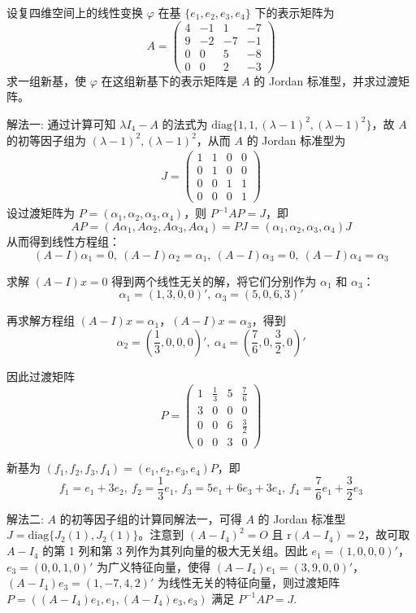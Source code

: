 \documentclass[../../main.tex]{subfiles}
\begin{document}
\begin{example}\label{example:7.59}
设复四维空间上的线性变换 $\varphi$ 在基 $\{e_1,e_2,e_3,e_4\}$ 下的表示矩阵为
\[
A = \begin{pmatrix}
4 & -1 & 1 & -7 \\
9 & -2 & -7 & -1 \\
0 & 0 & 5 & -8 \\
0 & 0 & 2 & -3
\end{pmatrix}
\]
求一组新基，使 $\varphi$ 在这组新基下的表示矩阵是 $A$ 的 Jordan 标准型，并求过渡矩阵。
\end{example}
\begin{solution}
{\color{blue}解法一:}
通过计算可知 $\lambda I_4 - A$ 的法式为 $\mathrm{diag}\{1,1,(\lambda - 1)^2,(\lambda - 1)^2\}$，故 $A$ 的初等因子组为 $(\lambda - 1)^2,(\lambda - 1)^2$，从而 $A$ 的 Jordan 标准型为
\begin{align*}
J = \begin{pmatrix}
1 & 1 & 0 & 0 \\
0 & 1 & 0 & 0 \\
0 & 0 & 1 & 1 \\
0 & 0 & 0 & 1
\end{pmatrix}
\end{align*}
设过渡矩阵为 $P = (\alpha_1,\alpha_2,\alpha_3,\alpha_4)$，则 $P^{-1}AP = J$，即
\[AP = (A\alpha_1,A\alpha_2,A\alpha_3,A\alpha_4) = PJ = (\alpha_1,\alpha_2,\alpha_3,\alpha_4)J\]
从而得到线性方程组：
\[(A - I)\alpha_1 = 0,\ (A - I)\alpha_2 = \alpha_1,\ (A - I)\alpha_3 = 0,\ (A - I)\alpha_4 = \alpha_3\]

求解 $(A - I)x = 0$ 得到两个线性无关的解，将它们分别作为 $\alpha_1$ 和 $\alpha_3$：
\[\alpha_1 = (1,3,0,0)',\ \alpha_3 = (5,0,6,3)'\]

再求解方程组 $(A - I)x = \alpha_1$，$(A - I)x = \alpha_3$，得到
\[\alpha_2 = (\frac{1}{3},0,0,0)',\ \alpha_4 = (\frac{7}{6},0,\frac{3}{2},0)'\]

因此过渡矩阵
\[
P = \begin{pmatrix}
1 & \frac{1}{3} & 5 & \frac{7}{6} \\
3 & 0 & 0 & 0 \\
0 & 0 & 6 & \frac{3}{2} \\
0 & 0 & 3 & 0
\end{pmatrix}
\]

新基为 $(f_1,f_2,f_3,f_4) = (e_1,e_2,e_3,e_4)P$，即
\[f_1 = e_1 + 3e_2,\ f_2 = \frac{1}{3}e_1,\ f_3 = 5e_1 + 6e_3 + 3e_4,\ f_4 = \frac{7}{6}e_1 + \frac{3}{2}e_3\] 

{\color{blue}解法二:}
$A$ 的初等因子组的计算同解法一，可得 $A$ 的 Jordan 标准型 $J = \mathrm{diag}\{J_2(1),J_2(1)\}$。注意到 $(A - I_4)^2 = O$ 且 $\mathrm{r}(A - I_4) = 2$，故可取 $A - I_4$ 的第 1 列和第 3 列作为其列向量的极大无关组。因此 $e_1 = (1,0,0,0)'$，$e_3 = (0,0,1,0)'$ 为广义特征向量，使得 $(A - I_4)e_1 = (3,9,0,0)'$，$(A - I_4)e_3 = (1,-7,4,2)'$ 为线性无关的特征向量，则过渡矩阵 $P = ((A - I_4)e_1,e_1,(A - I_4)e_3,e_3)$ 满足 $P^{-1}AP = J$.
\end{solution}
\end{document}
